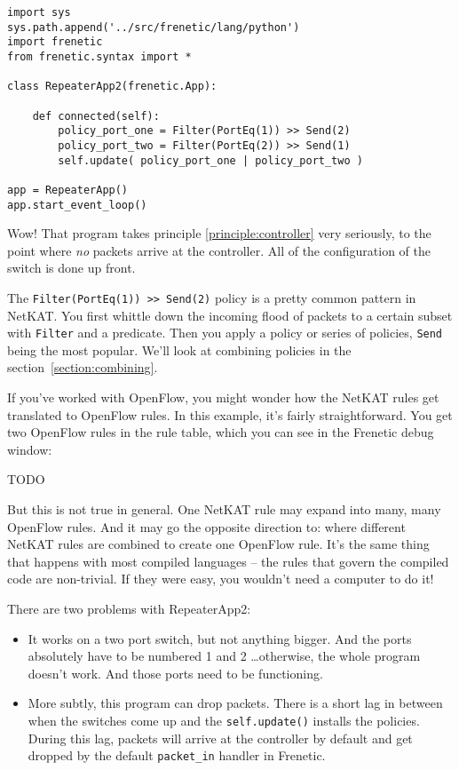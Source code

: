 \begin{lstlisting}
import sys
sys.path.append('../src/frenetic/lang/python')
import frenetic
from frenetic.syntax import *

class RepeaterApp2(frenetic.App):

    def connected(self):
        policy_port_one = Filter(PortEq(1)) >> Send(2)
        policy_port_two = Filter(PortEq(2)) >> Send(1)
        self.update( policy_port_one | policy_port_two )

app = RepeaterApp()
app.start_event_loop()
\end{lstlisting}

Wow!  
That program takes principle \ref{principle:controller} very seriously, to the point where \emph{no} packets 
arrive at the controller.
All of the configuration of the switch is done up front.

The \texttt{Filter(PortEq(1)) >> Send(2)} policy is a pretty common pattern in NetKAT.
You first whittle down the incoming flood of packets to a certain subset with \texttt{Filter} and a 
predicate.
Then you apply a policy or series of policies, \texttt{Send} being the most popular.
We'll look at combining policies in the section~\ref{section:combining}.

If you've worked with OpenFlow, you might wonder how the NetKAT rules get translated to OpenFlow rules.
In this example, it's fairly straightforward.
You get two OpenFlow rules in the rule table, which you can see in the Frenetic debug window:

TODO

But this is not true in general.  
One NetKAT rule may expand into many, many OpenFlow rules.
And it may go the opposite direction to: where different NetKAT rules are combined to create one OpenFlow rule.
It's the same thing that happens with most compiled languages -- the rules that govern the compiled code
are non-trivial. 
If they were easy, you wouldn't need a computer to do it!

There are two problems with RepeaterApp2:

\begin{itemize}
  \item It works on a two port switch, but not anything bigger.  
  And the ports absolutely have
  to be numbered 1 and 2 \ldots otherwise, the whole program doesn't work.
  And those ports need to be functioning.
  \item More subtly, this program can drop packets.  
  There is a short lag in between when the switches come up and the \texttt{self.update()} installs
  the policies. 
  During this lag, packets will arrive at the controller by default and get dropped by the 
  default \texttt{packet\_in} handler in Frenetic.   
\end{itemize}

